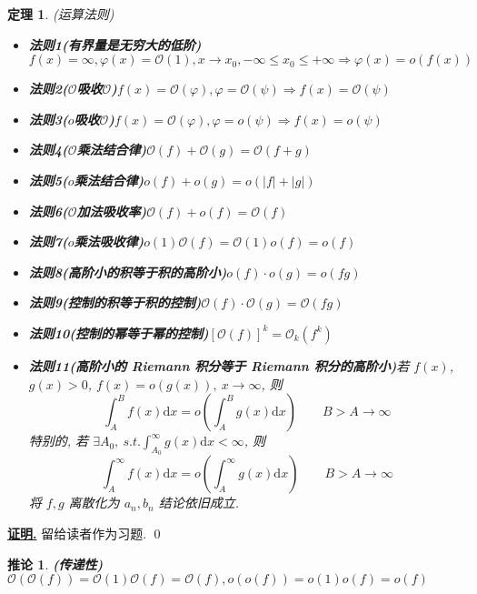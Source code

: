 \documentclass[10pt,a4paper]{book}
\theoremstyle{thmstyle} %
\newtheorem{theorem}{定理}[chapter]
\theoremstyle{defstyle} %
\newtheorem{corollary}{推论}[chapter]
\theoremstyle{prostyle} %
\renewenvironment{proof}[1][证明]{\par{\kaishu \uline{\textbf{#1.}}} \;\fangsong}{\qed\par}
\begin{document}
	\begin{theorem}
		(运算法则)\begin{itemize}
			\item \textbf{法则1\quad (有界量是无穷大的低阶)}\quad$f(x)=\infty,\varphi(x)=\mathcal{O}(1),x\rightarrow x_0,-\infty\leqslant x_0 \leqslant+\infty\Longrightarrow \varphi(x)=o(f(x))$
			\item \textbf{法则2\quad ($\mathcal{O}$吸收$\mathcal{O}$)}\quad$f(x)=\mathcal{O}(\varphi),\varphi=\mathcal{O}(\psi)\Longrightarrow f(x)=\mathcal{O}(\psi)$
			\item \textbf{法则3\quad($o$吸收$\mathcal{O}$)}\quad$f(x)=\mathcal{O}(\varphi),\varphi=o(\psi)\Longrightarrow f(x)=o(\psi)$
			\item \textbf{法则4\quad ($\mathcal{O}$乘法结合律)}\quad$\mathcal{O}(f)+\mathcal{O}(g)=\mathcal{O}(f+g)$
			\item \textbf{法则5\quad ($o$乘法结合律)}\quad$o(f)+o(g)=o(|f|+|g|)$
			\item \textbf{法则6\quad ($\mathcal{O}$加法吸收率)}\quad$\mathcal{O}(f)+o(f)=\mathcal{O}(f)$
			\item \textbf{法则7\quad ($o$乘法吸收律)}\quad$o(1)\mathcal{O}(f)=\mathcal{O}(1)o(f)=o(f)$
			\item \textbf{法则8\quad (高阶小的积等于积的高阶小)}\quad$o(f)\cdot o(g)=o(fg)$
			\item \textbf{法则9\quad (控制的积等于积的控制)}\quad$\mathcal{O}(f)\cdot \mathcal{O}(g)=\mathcal{O}(fg)$
			\item \textbf{法则10\quad (控制的幂等于幂的控制)}\quad$[\mathcal{O}(f)]^k=\mathcal{O}_k(f^k)$
			\item \textbf{法则11\quad (高阶小的 Riemann 积分等于 Riemann 积分的高阶小)}\quad 若 $f(x)$,$g(x)>0$, $f(x)=o(g(x)),\  x\rightarrow\infty$, 则
			$$
			\int_A^B{f\left( x \right) \mathrm{d}x=o\left( \int_A^B{g\left( x \right)}\mathrm{d}x \right)}\quad\quad B>A\rightarrow\infty
			$$
			特别的, 若 $\exists A_0, \ s.t.\displaystyle\int_{A_0}^{\infty}g(x)\mathrm{d}x<\infty$, 则 
			$$
			\int_A^\infty{f\left( x \right) \mathrm{d}x=o\left( \int_A^\infty{g\left( x \right)}\mathrm{d}x \right)}\quad\quad B>A\rightarrow\infty
			$$
			将 $f,g$ 离散化为 $a_n,b_n$ 结论依旧成立.
		\end{itemize}
	\end{theorem}
	\begin{proof}
		留给读者作为习题.
	\end{proof}
	\begin{corollary}
		\textbf{(传递性)}\quad$\mathcal{O}(\mathcal{O}(f))=\mathcal{O}(1)\mathcal{O}(f)=\mathcal{O}(f),o(o(f))=o(1)o(f)=o(f)$
	\end{corollary}
\end{document}
